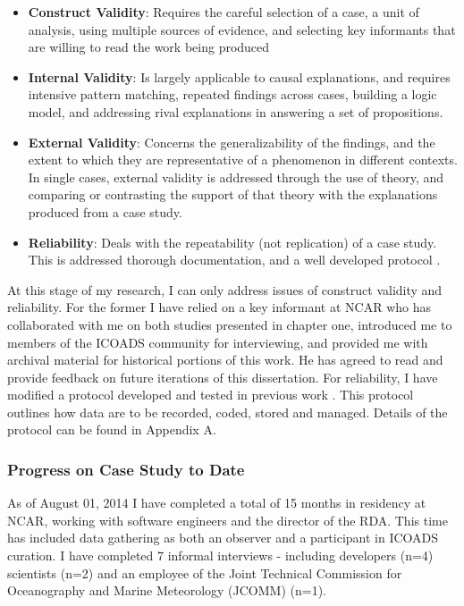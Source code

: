\documentclass[thesis,tocnosub,noragright,centerchapter,12pt]{uiucecethesis09}
\begin{document}
{\begin{itemize}
\item
  \textbf{Construct Validity}: Requires the careful selection of a case, a unit
  of analysis, using multiple sources of evidence, and selecting key
  informants that are willing to read the work being produced
\item
  \textbf{Internal Validity}: Is largely applicable to causal explanations, and
  requires intensive pattern matching, repeated findings across cases,
  building a logic model, and addressing rival explanations in answering
  a set of propositions.
\item
  \textbf{External Validity}: Concerns the generalizability of the findings, and the extent to which they are representative of a phenomenon in
  different contexts. In single cases, external validity is addressed
  through the use of theory, and comparing or contrasting the support of
  that theory with the explanations produced from a case study.
\item
  \textbf{Reliability}: Deals with the repeatability (not replication) of a case
  study. This is addressed thorough documentation, and a well
  developed protocol \citep{yin2003case}.
\end{itemize}

At this stage of my research, I can only address issues of construct
validity and reliability. For the former I have relied on a key
informant at NCAR who has collaborated with me on both studies presented
in chapter one, introduced me to members of the ICOADS community for
interviewing, and provided me with archival material for historical
portions of this work. He has agreed to read and provide feedback on
future iterations of this dissertation. For reliability, I have modified a protocol developed and tested in previous work \citep{weber2014extending}.
This protocol outlines how data are to be recorded, coded, stored and managed.
Details of the protocol can be found in Appendix A.\\

\subsubsection*{Progress on Case Study to Date}

As of August 01, 2014 I have completed a total of 15 months in residency at NCAR,
working with software engineers and the director of the RDA. This time has included data gathering as both
an observer and a participant in ICOADS curation. I have completed 7
informal interviews - including developers (n=4) scientists (n=2) and an employee of the Joint Technical Commission for Oceanography and Marine Meteorology (JCOMM) (n=1).\\

}
\end{document}
